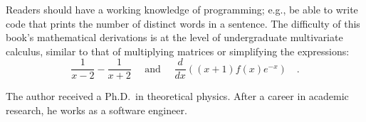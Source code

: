 Readers should have a working knowledge of programming; e.g.,
be able to write code that prints the number of distinct words in
a sentence. The difficulty of this book's mathematical derivations
is at the level of undergraduate multivariate calculus, similar to that of multiplying
matrices or simplifying the expressions:
\[
\frac{1}{x-2}-\frac{1}{x+2}\quad\text{ and }\quad\frac{d}{dx}\left((x+1)f(x)e^{-x}\right)\quad.
\]

The author received a Ph.D. in theoretical physics. After a career in academic research, he works as a software engineer.

